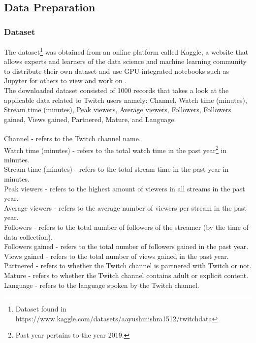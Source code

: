 \documentclass[runningheads]{llncs}
\begin{document}
\subsection{Data Preparation}
\subsubsection{Dataset}
The dataset\footnote{Dataset found in https://www.kaggle.com/datasets/aayushmishra1512/twitchdata} was obtained from an online platform called Kaggle, a website that allows experts and learners of the data science and machine learning community to distribute their own dataset and use GPU-integrated notebooks such as Jupyter for others to view and work on \cite{uslu_2022}. \\

The downloaded dataset consisted of 1000 records that takes a look at the applicable data related to Twitch users namely: Channel, Watch time (minutes), Stream time (minutes), Peak viewers, Average viewers, Followers, Followers gained, Views gained, Partnered, Mature, and Language.\\
\\Channel - refers to the Twitch channel name.\\
Watch time (minutes) - refers to the total watch time in the past year\footnote{Past year pertains to the year 2019.} in minutes.\\
Stream time (minutes) -  refers to the total stream time in the past year in minutes.\\
Peak viewers - refers to the highest amount of viewers in all streams in the past year.\\
Average viewers - refers to the average number of viewers per stream in the past year.\\
Followers - refers to the total number of followers of the streamer (by the time of data collection).\\
Followers gained - refers to the total number of followers gained in the past year.\\
Views gained - refers to the total number of views gained in the past year.\\
Partnered - refers to whether the Twitch channel is partnered with Twitch or not.\\
Mature - refers to whether the Twitch channel contains adult or explicit content.\\
Language - refers to the language spoken by the Twitch channel.\\
\end{document}

